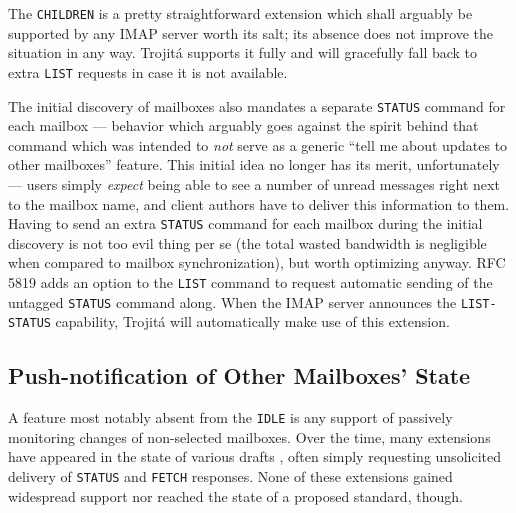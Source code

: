 \documentclass[trojita]{subfiles}
\begin{document}
The {\tt CHILDREN} is a pretty straightforward extension which shall arguably be supported by any IMAP server worth its
salt; its absence does not improve the situation in any way.  Trojitá supports it fully and will gracefully fall back to
extra {\tt LIST} requests in case it is not available.

The initial discovery of mailboxes also mandates a separate {\tt STATUS} command for each mailbox --- behavior which
arguably goes against the spirit behind that command which was intended to {\em not} serve as a generic ``tell me about
updates to other mailboxes'' feature.  This initial idea no longer has its merit, unfortunately --- users simply {\em
expect} being able to see a number of unread messages right next to the mailbox name, and client authors have to deliver
this information to them.  Having to send an extra {\tt STATUS} command for each mailbox during the initial discovery is
not too evil thing per se (the total wasted bandwidth is negligible when compared to mailbox synchronization), but worth
optimizing anyway.  RFC 5819 \cite{rfc5819} adds an option to the {\tt LIST} command to request automatic sending of the
untagged {\tt STATUS} command along.  When the IMAP server announces the {\tt LIST-STATUS} capability, Trojitá will
automatically make use of this extension.

\subsection{Push-notification of Other Mailboxes' State}

A feature most notably absent from the {\tt IDLE} is any support of passively monitoring changes of non-selected
mailboxes.  Over the time, many extensions have appeared in the state of various drafts
\cite{draft-wener-lemonade-clearidle} \cite{draft-gulbrandsen-imap-nostore} \cite{draft-magicaltux-imap4-idleplus},
often simply requesting unsolicited delivery of {\tt STATUS} and {\tt FETCH} responses.  None of these extensions gained
widespread support nor reached the state of a proposed standard, though.
\end{document}
